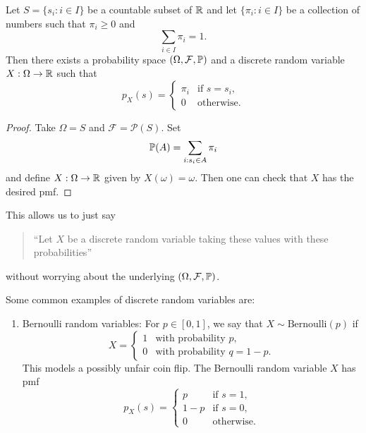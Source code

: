 \begin{theorem}
  Let $S = \{s_i : i \in I\}$ be a countable
  subset of $\mathbb{R}$ and let
  $\{\pi_i : i \in I\}$ be a collection of
  numbers such that $\pi_i \ge 0$ and
  \[
    \sum_{i \in I} \pi_i = 1.
  \]
  Then there exists a probability space
  $(\Omega, \mathcal{F}, \mathbb{P})$ and a discrete
  random variable $X : \Omega \to \mathbb{R}$ such that
  \[
    p_X(s) =
    \begin{cases}
      \pi_i & \text{if } s = s_i, \\
      0 & \text{otherwise}.
    \end{cases}
  \]
\end{theorem}

\begin{proof}
  Take $\Omega = S$ and
  $\mathcal{F} = \mathcal{P}(S)$. Set
  \[\mathbb{P}(A) = \sum_{i : s_i \in A} \pi_i\]
  and define $X : \Omega \to \mathbb{R}$ given by
  $X(\omega) = \omega$. Then one can check
  that $X$ has the desired pmf.
\end{proof}

\begin{remark}
  This allows us to just say
  \begin{quote}
    ``Let $X$ be a discrete random variable taking
    these values with these probabilities''
  \end{quote}
  without worrying about the underlying
  $(\Omega, \mathcal{F}, \mathbb{P})$.
\end{remark}

\begin{example}
  Some common examples of discrete random variables
  are:
  \begin{enumerate}
    \item Bernoulli random variables:
      For $p \in [0, 1]$, we say that
      $X \sim \text{Bernoulli}(p)$ if
      \[
        X =
        \begin{cases}
          1 & \text{with probability } p, \\
          0 & \text{with probability } q = 1 - p.
        \end{cases}
      \]
      This models a possibly unfair
      coin flip. The Bernoulli random variable $X$
      has pmf
      \[
        p_X(s) =
        \begin{cases}
          p & \text{if } s = 1, \\
          1 - p & \text{if } s = 0, \\
          0 & \text{otherwise}.
        \end{cases}
      \]
  \end{enumerate}
\end{example}
